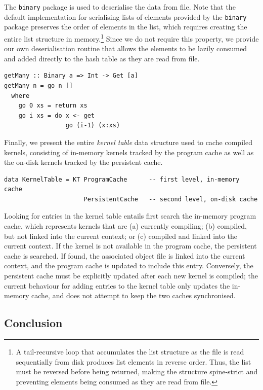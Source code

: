 The \texttt{binary} package is used to deserialise the data from file. Note that
the default implementation for serialising lists of elements provided by the
\texttt{binary} package preserves the order of elements in the list, which
requires creating the entire list structure in memory.\footnote{A tail-recursive
loop that accumulates the list structure as the file is read sequentially from
disk produces list elements in reverse order. Thus, the list must be reversed
before being returned, making the structure spine-strict and preventing elements
being consumed as they are read from file.} Since we do not require this
property, we provide our own deserialisation routine that allows the elements to
be lazily consumed and added directly to the hash table as they are read from
file.

\begin{lstlisting}[style=haskell]
getMany :: Binary a => Int -> Get [a]
getMany n = go n []
  where
    go 0 xs = return xs
    go i xs = do x <- get
                 go (i-1) (x:xs)
\end{lstlisting}

Finally, we present the entire \emph{kernel table} data structure used to cache
compiled kernels, consisting of in-memory kernels tracked by the program cache
as well as the on-disk kernels tracked by the persistent cache.

\begin{lstlisting}[style=haskell]
data KernelTable = KT ProgramCache      -- first level, in-memory cache
                      PersistentCache   -- second level, on-disk cache
\end{lstlisting}

Looking for entries in the kernel table entails first search the in-memory
program cache, which represents kernels that are (a) currently compiling; (b)
compiled, but not linked into the current context; or (c) compiled and linked
into the current context. If the kernel is not available in the program cache,
the persistent cache is searched. If found, the associated object file is linked
into the current context, and the program cache is updated to include this
entry. Conversely, the persistent cache must be explicitly updated after each
new kernel is compiled; the current behaviour for adding entries to the kernel
table only updates the in-memory cache, and does not attempt to keep the two
caches synchronised.


\subsection{Conclusion}

